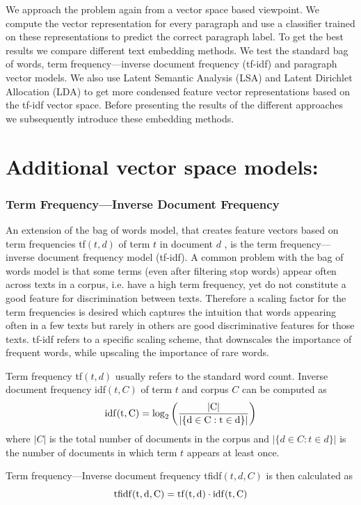 We approach the problem again from a vector space based viewpoint. We compute the vector representation for every paragraph and use a classifier trained on these representations to predict the correct paragraph label. To get the best results we compare different text embedding methods. We test the standard bag of words, term frequency---inverse document frequency (tf-idf) and paragraph vector models. We also use Latent Semantic Analysis (LSA) and Latent Dirichlet Allocation (LDA) to get more condensed feature vector representations based on the tf-idf vector space. Before presenting the results of the different approaches we subsequently introduce these embedding methods.

\section*{Additional vector space models:}

\subsubsection*{Term Frequency---Inverse Document Frequency}

An extension of the bag of words model, that creates feature vectors based on term frequencies tf$(t,d)$ of term $t$ in document $d$ , is the term frequency---inverse document frequency model (tf-idf).
A common problem with the bag of words model is that some terms (even
after filtering stop words) appear often across texts in a corpus,
i.e. have a high term frequency, yet do not constitute a good feature
for discrimination between texts. Therefore a scaling factor for the
term frequencies is desired which captures the intuition that words
appearing often in a few texts but rarely in others are good discriminative
features for those texts. tf-idf refers to a specific scaling scheme, that downscales the
importance of frequent words, while upscaling the importance of rare
words. 

Term frequency tf$(t,d)$ usually refers to the standard word count.
Inverse document frequency idf$(t,C)$ of term $t$ and corpus $C$
can be computed as 
\[
\rm{idf}(t,C)=\log_{2}\left(\frac{|C|}{|\{d\in C:t\in d\}|}\right)
\]
where $|C|$ is the total number of documents in the corpus and $|\{d\in C:t\in d\}|$
is the number of documents in which term $t$ appears at least once.

Term frequency---Inverse document frequency tfidf$(t,d,C)$ is then
calculated as 
\[
\rm{tfidf}(t,d,C)=\rm{tf}(t,d)\cdot \rm{idf}(t,C)
\]


